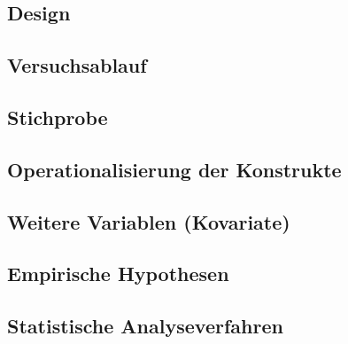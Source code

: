 \subsection{Design} \label{sec:Design}

\subsection{Versuchsablauf}
\subsection{Stichprobe}
\subsection{Operationalisierung der Konstrukte}
\subsection{Weitere Variablen (Kovariate)}
\subsection{Empirische Hypothesen}
\subsection{Statistische Analyseverfahren}